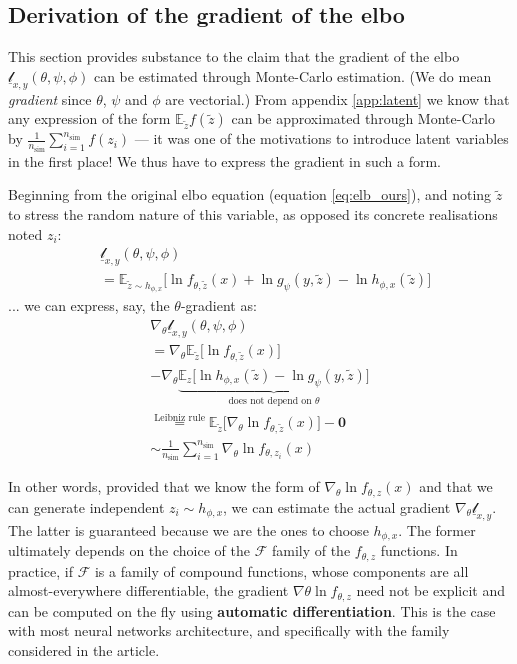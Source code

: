 \documentclass{article}
\begin{document}
\begin{appendix}
\begin{multicols}{2}
\subsection{Derivation of the gradient of the \gls{elbo}} \label{app:elbderivative}

This section provides substance to the claim that the gradient of the \gls{elbo} $\underline{\mathscr{l}}_{x,y}(\theta,\psi,\phi)$ can be estimated through Monte-Carlo estimation. (We do mean \textit{gradient} since $\theta$, $\psi$ and $\phi$ are vectorial.) From appendix \ref{app:latent} we know that any expression of the form $\mathbb{E}_{\tilde z}f(\tilde z)$ can be approximated through Monte-Carlo by $\frac{1}{n_\text{sim}}\sum_{i=1}^{n_\text{sim}} f(z_i)$ — it was one of the motivations to introduce latent variables in the first place! We thus have to express the gradient in such a form.

Beginning from the original \gls{elbo} equation (equation \ref{eq:elb_ours}), and noting $\tilde z$ to stress the random nature of this variable, as opposed its concrete realisations noted $z_i$: \begin{equation*}
\begin{aligned}
& \underline{\mathscr{l}}_{x,y}(\theta,\psi,\phi) \\
& =\mathbb{E}_{\tilde z\sim h_{\phi,x}} \Big[\ln f_{\theta,\tilde z}(x)+\ln g_\psi(y,\tilde z) -\ln h_{\phi,x}(\tilde z)\Big]
\end{aligned}
\end{equation*}
... we can express, say, the $\theta$-gradient as: \begin{gather*}
\nabla_\theta\underline{\mathscr{l}}_{x,y}(\theta,\psi,\phi) \\
= \nabla_\theta \mathbb{E}_{\tilde z} \big[ \ln f_{\theta,\tilde z}(x) \big] \\
- \nabla_\theta\underbrace{\mathbb{E}_{z}\Big[\ln h_{\phi,x}(\tilde z) - \ln g_\psi(y,\tilde z)  \Big]}_{\text{does not depend on }\theta} \\
\overset{\text{Leibniz rule}}{=} \mathbb{E}_{\tilde z} \big[ \nabla_\theta \ln f_{\theta,\tilde z}(x) \big]-\mathbf{0} \\
\sim \frac{1}{n_\text{sim}}\sum_{i=1}^{n_\text{sim}} \nabla_\theta \ln f_{\theta,z_i}(x)
\end{gather*}

In other words, provided that we know the form of $\nabla_\theta \ln f_{\theta,z}(x)$ and that we can generate independent $z_i\sim h_{\phi,x}$, we can estimate the actual gradient $\nabla_\theta\underline{\mathscr{l}}_{x,y}$. The latter is guaranteed because we are the ones to choose $h_{\phi,x}$. The former ultimately depends on the choice of the $\mathcal{F}$ family of the $f_{\theta,z}$ functions. In practice, if $\mathcal{F}$ is a family of compound functions, whose components are all almost-everywhere differentiable, the gradient $\nabla \theta \ln f_{\theta,z}$ need not be explicit and can be computed on the fly using \textbf{automatic differentiation}. This is the case with most neural networks architecture, and specifically with the family considered in the article.


\end{multicols}
\end{appendix}
\end{document}
